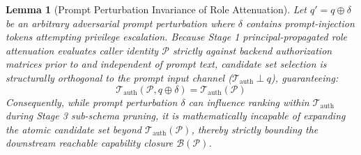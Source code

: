 \documentclass[conference,10pt]{IEEEtran}
\newtheorem{lemma}{Lemma}
\begin{document}
\begin{lemma}[Prompt Perturbation Invariance of Role Attenuation]
Let $q' = q \oplus \delta$ be an arbitrary adversarial prompt perturbation where $\delta$ contains prompt-injection tokens attempting privilege escalation. Because Stage 1 principal-propagated role attenuation evaluates caller identity $\mathcal{P}$ strictly against backend authorization matrices prior to and independent of prompt text, candidate set selection is structurally orthogonal to the prompt input channel ($\mathcal{T}_{\text{auth}} \perp q$), guaranteeing:
\begin{equation}
\mathcal{T}_{\text{auth}}(\mathcal{P}, q \oplus \delta) = \mathcal{T}_{\text{auth}}(\mathcal{P})
\end{equation}
Consequently, while prompt perturbation $\delta$ can influence ranking within $\mathcal{T}_{\text{auth}}$ during Stage 3 sub-schema pruning, it is mathematically incapable of expanding the atomic candidate set beyond $\mathcal{T}_{\text{auth}}(\mathcal{P})$, thereby strictly bounding the downstream reachable capability closure $\mathcal{B}(\mathcal{P})$.
\end{lemma}
\end{document}
